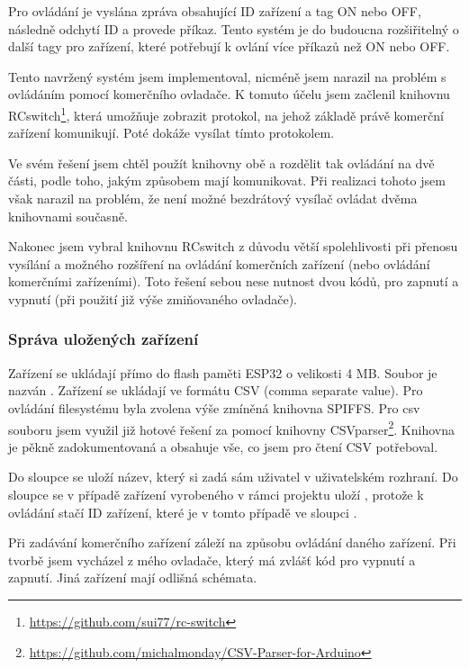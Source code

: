 \documentclass[11pt,a4paper,twoside,openright]{report}
\begin{document}
	
	Pro ovládání  je vyslána zpráva obsahující ID zařízení a tag ON nebo OFF,  následně odchytí ID a provede příkaz. Tento systém je do budoucna rozšiřitelný o další tagy pro zařízení, které potřebují k ovlání více příkazů než ON nebo OFF.
	
	
	Tento navržený systém jsem implementoval, nicméně jsem narazil na problém s ovládáním pomocí komerčního ovladače. K tomuto účelu jsem začlenil knihovnu RCswitch\footnote{\url{https://github.com/sui77/rc-switch}}, která umožňuje zobrazit protokol, na jehož základě právě komerční zařízení komunikují. Poté dokáže vysílat tímto protokolem. 
	
	
	Ve svém řešení jsem chtěl použít knihovny obě a rozdělit tak ovládání na dvě části, podle toho, jakým způsobem mají komunikovat. Při realizaci tohoto jsem však narazil na problém, že není možné bezdrátový vysílač ovládat dvěma knihovnami současně.
	
	
	Nakonec jsem vybral knihovnu RCswitch z důvodu větší spolehlivosti při přenosu vysílání a možného rozšíření na ovládání komerčních zařízení (nebo ovládání komerčními zařízeními). Toto řešení sebou nese nutnost dvou kódů, pro zapnutí a vypnutí (při použití již výše zmiňovaného ovladače). 
	
	
	\subsubsection{Správa uložených zařízení}
	
	Zařízení se ukládají přímo do flash paměti ESP32 o velikosti 4 MB. Soubor je nazván . Zařízení se ukládají ve formátu CSV (comma separate value). Pro ovládání filesystému byla zvolena výše zmíněná knihovna SPIFFS. Pro  csv souboru jsem využil již hotové řešení za pomocí knihovny CSVparser\footnote{\url{https://github.com/michalmonday/CSV-Parser-for-Arduino}}. Knihovna je pěkně zadokumentovaná a obsahuje vše, co jsem pro čtení CSV potřeboval. 
	
	
	Do sloupce  se uloží název, který si zadá sám uživatel v uživatelském rozhraní. Do sloupce  se v případě zařízení vyrobeného v rámci projektu uloží , protože k ovládání stačí ID zařízení, které je v tomto případě ve sloupci .
	
	
	Při zadávání komerčního zařízení záleží na způsobu ovládání daného zařízení. Při tvorbě jsem vycházel z mého ovladače, který má zvlášť kód pro vypnutí a zapnutí. Jiná zařízení mají odlišná schémata. 
	
\end{document}
